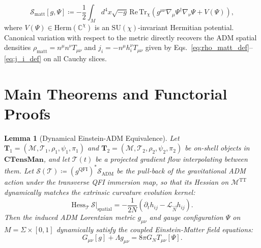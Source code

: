\documentclass[11pt,a4paper,reqno]{amsart}
\newtheorem{lemma}[theorem]{Lemma}
\theoremstyle{definition}
\numberwithin{equation}{section}
\newcommand{\CTens}{\mathbf{CTensMan}}
\newcommand{\Tr}{\mathrm{Tr}}
\newcommand{\QFI}{\mathrm{QFI}}
\begin{document}
\begin{enumerate}
    \begin{equation}
        \mathcal{S}_{\mathrm{matt}}[g, \Psi] \coloneqq -\frac{1}{2} \int_M d^4x \sqrt{-g} \, \mathrm{Re} \, \Tr_\chi \left( g^{\mu\nu} \nabla_\mu \Psi^\dagger \nabla_\nu \Psi + V(\Psi) \right), \label{eq:matter_action}
    \end{equation}
    where $V(\Psi) \in \mathrm{Herm}(\mathbb{C}^\chi)$ is an $\mathrm{SU}(\chi)$-invariant Hermitian potential. Canonical variation with respect to the metric directly recovers the ADM spatial densities $\rho_{\mathrm{matt}} = n^\mu n^\nu T_{\mu\nu}$ and $j_i = -n^\mu h_i^\nu T_{\mu\nu}$ given by Eqs.~\eqref{eq:rho_matt_def}--\eqref{eq:j_i_def} on all Cauchy slices.
\end{enumerate}

\section{Main Theorems and Functorial Proofs}
\label{sec:theorems}

\begin{lemma}[Dynamical Einstein-ADM Equivalence] \label{lem:adm_gradient}
Let $\mathbf{T}_1 = (\mathcal{M}, \mathcal{T}_1, \rho_1, \psi_1, \pi_1)$ and $\mathbf{T}_2 = (\mathcal{M}, \mathcal{T}_2, \rho_2, \psi_2, \pi_2)$ be on-shell objects in $\CTens$, and let $\mathcal{T}(t)$ be a projected gradient flow interpolating between them. Let $\mathcal{S}(\mathcal{T}) \coloneqq (g^{\QFI})^* \mathcal{S}_{\mathrm{ADM}}$ be the pull-back of the gravitational ADM action under the transverse QFI immersion map, so that its Hessian on $\mathcal{M}^{\mathrm{TT}}$ dynamically matches the extrinsic curvature evolution kernel:
\begin{equation}
    \mathrm{Hess}_{\mathcal{T}} \, \mathcal{S} \big|_{\mathrm{spatial}} = -\frac{1}{2N} \left( \partial_t h_{ij} - \mathcal{L}_{\vec{N}} h_{ij} \right). \label{eq:hessian_condition}
\end{equation}
Then the induced ADM Lorentzian metric $g_{\mu\nu}$ and gauge configuration $\Psi$ on $M = \Sigma \times [0, 1]$ dynamically satisfy the coupled Einstein-Matter field equations:
\begin{equation}
    G_{\mu\nu}[g] + \Lambda g_{\mu\nu} = 8\pi G_N T_{\mu\nu}[\Psi].
\end{equation}
\end{lemma}
\end{document}
